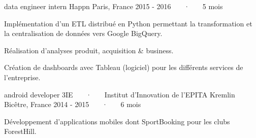 \begin{cventries}
  \cventry
    {data engineer intern} %
    {Happn} %
    {Paris, France} %
    {2015 - 2016 ~~~·~~~ 5 mois} %
    {
      \begin{cvitems} %
        \item {Implémentation d'un ETL distribué en Python permettant la transformation et la centralisation de données vers Google BigQuery.}
        \item {Réalisation d'analyses produit, acquisition \& business.}
        \item {Création de dashboards avec Tableau (logiciel) pour les différents services de l'entreprise.}
      \end{cvitems}
    }

  \cventry
    {android developer} %
    {3IE ~~~·~~~ Institut d'Innovation de l'EPITA} %
    {Kremlin Bicêtre, France} %
    {2014 - 2015 ~~~·~~~ 6 mois} %
    {
      \begin{cvitems} %
        \item {Développement d'applications mobiles dont SportBooking pour les clubs ForestHill.}
      \end{cvitems}
    }


\end{cventries}
